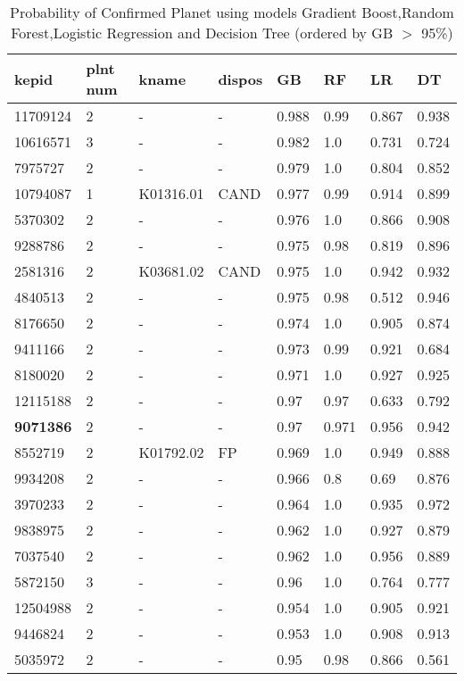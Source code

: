 \begin{table}[!htbp]
 \centering
 \caption{Probability of Confirmed Planet using models Gradient Boost,Random Forest,Logistic Regression and Decision Tree (ordered by GB $>$ 95\%)}
 \label{dataGBRFLRDTtab} 
  \begin{tabular}
{| 
 p{}| 
 p{}| 
 p{}| 
 p{}| 
 p{}| 
 p{}| 
 p{}| 
 p{}| 
}\hline 
\textbf{kepid} &\textbf{plnt num} &\textbf{kname} &\textbf{dispos} &\textbf{GB} &\textbf{RF} &\textbf{LR} &\textbf{DT} \\ \hline 
11709124 &2 &- &- &0.988 &0.99 &0.867 &0.938 \\ \hline 
10616571 &3 &- &- &0.982 &1.0 &0.731 &0.724 \\ \hline 
7975727 &2 &- &- &0.979 &1.0 &0.804 &0.852 \\ \hline 
10794087 &1 &K01316.01 &CAND &0.977 &0.99 &0.914 &0.899 \\ \hline 
5370302 &2 &- &- &0.976 &1.0 &0.866 &0.908 \\ \hline 
9288786 &2 &- &- &0.975 &0.98 &0.819 &0.896 \\ \hline 
2581316 &2 &K03681.02 &CAND &0.975 &1.0 &0.942 &0.932 \\ \hline 
4840513 &2 &- &- &0.975 &0.98 &0.512 &0.946 \\ \hline 
8176650 &2 &- &- &0.974 &1.0 &0.905 &0.874 \\ \hline 
9411166 &2 &- &- &0.973 &0.99 &0.921 &0.684 \\ \hline 
8180020 &2 &- &- &0.971 &1.0 &0.927 &0.925 \\ \hline 
12115188 &2 &- &- &0.97 &0.97 &0.633 &0.792 \\ \hline 
\textbf{9071386} &2 &- &- &0.97 &0.971 &0.956 &0.942 \\ \hline 
8552719 &2 &K01792.02 &FP &0.969 &1.0 &0.949 &0.888 \\ \hline 
9934208 &2 &- &- &0.966 &0.8 &0.69 &0.876 \\ \hline 
3970233 &2 &- &- &0.964 &1.0 &0.935 &0.972 \\ \hline 
9838975 &2 &- &- &0.962 &1.0 &0.927 &0.879 \\ \hline 
7037540 &2 &- &- &0.962 &1.0 &0.956 &0.889 \\ \hline 
5872150 &3 &- &- &0.96 &1.0 &0.764 &0.777 \\ \hline 
12504988 &2 &- &- &0.954 &1.0 &0.905 &0.921 \\ \hline 
9446824 &2 &- &- &0.953 &1.0 &0.908 &0.913 \\ \hline 
5035972 &2 &- &- &0.95 &0.98 &0.866 &0.561 \\ \hline 
\end{tabular} 
\end{table}